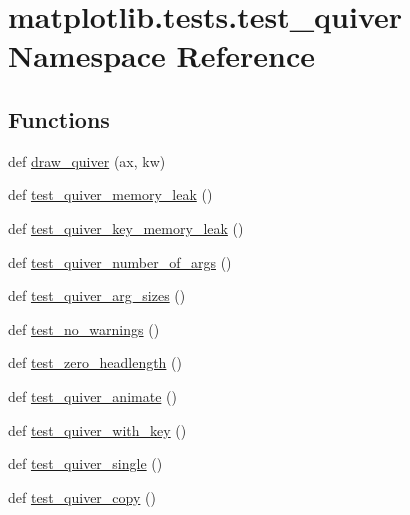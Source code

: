 \hypertarget{namespacematplotlib_1_1tests_1_1test__quiver}{}\section{matplotlib.\+tests.\+test\+\_\+quiver Namespace Reference}
\label{namespacematplotlib_1_1tests_1_1test__quiver}
\subsection*{Functions}
\begin{DoxyCompactItemize}
\item 
def \hyperlink{namespacematplotlib_1_1tests_1_1test__quiver_a81f72e82e400f747593892d86e070c31}{draw\+\_\+quiver} (ax, kw)
\item 
def \hyperlink{namespacematplotlib_1_1tests_1_1test__quiver_afcf9ed8497ca3edae08f970a9d0818db}{test\+\_\+quiver\+\_\+memory\+\_\+leak} ()
\item 
def \hyperlink{namespacematplotlib_1_1tests_1_1test__quiver_a1da405ef6c98e45e5e9bdbd5062a1499}{test\+\_\+quiver\+\_\+key\+\_\+memory\+\_\+leak} ()
\item 
def \hyperlink{namespacematplotlib_1_1tests_1_1test__quiver_ab3812468e8538e32ac4caff89650adf3}{test\+\_\+quiver\+\_\+number\+\_\+of\+\_\+args} ()
\item 
def \hyperlink{namespacematplotlib_1_1tests_1_1test__quiver_af57a462f61f9fa1ceb00e9ce00ac0e88}{test\+\_\+quiver\+\_\+arg\+\_\+sizes} ()
\item 
def \hyperlink{namespacematplotlib_1_1tests_1_1test__quiver_a00afff9ca2e4f0e5e5be9406596d6dc0}{test\+\_\+no\+\_\+warnings} ()
\item 
def \hyperlink{namespacematplotlib_1_1tests_1_1test__quiver_aa3395bcd9fa533f690632fbcae293733}{test\+\_\+zero\+\_\+headlength} ()
\item 
def \hyperlink{namespacematplotlib_1_1tests_1_1test__quiver_a425994d8816c3fd59abaf36ce9c3f1b5}{test\+\_\+quiver\+\_\+animate} ()
\item 
def \hyperlink{namespacematplotlib_1_1tests_1_1test__quiver_a7a6702488622ada19d3aa22270a8e9e6}{test\+\_\+quiver\+\_\+with\+\_\+key} ()
\item 
def \hyperlink{namespacematplotlib_1_1tests_1_1test__quiver_a925113d6fef666ff62e94a5006eef4d0}{test\+\_\+quiver\+\_\+single} ()
\item 
def \hyperlink{namespacematplotlib_1_1tests_1_1test__quiver_a577a5ad6597305c030a9474855220615}{test\+\_\+quiver\+\_\+copy} ()

\end{DoxyCompactItemize}

